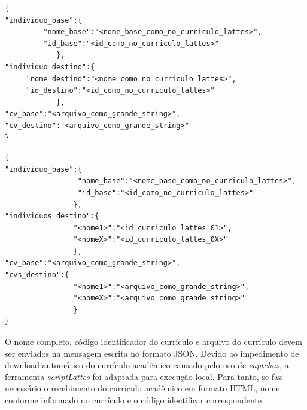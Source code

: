 \begin{lstlisting}[caption={Formato de mensagem recebido pela API (1:1).},label={lst:msgrecebida11}]
{
"individuo_base":{
         "nome_base":"<nome_base_como_no_curriculo_lattes>",
         "id_base":"<id_como_no_curriculo_lattes>"
            },
"individuo_destino":{
     "nome_destino":"<nome_como_no_curriculo_lattes>",
     "id_destino":"<id_como_no_curriculo_lattes>"
            },
"cv_base":"<arquivo_como_grande_string>",
"cv_destino":"<arquivo_como_grande_string>"
}
\end{lstlisting}



\begin{lstlisting}[caption={Formato de mensagem recebido pela API (1:N).},label={lst:msgrecebida1N}]
{
"individuo_base":{
	        	 "nome_base":"<nome_base_como_no_curriculo_lattes>",
    		     "id_base":"<id_como_no_curriculo_lattes>"
	            },
"individuos_destino":{
				"<nome1>":"<id_curriculo_lattes_01>",
				"<nomeX>":"<id_curriculo_lattes_0X>"
				},
"cv_base":"<arquivo_como_grande_string>",
"cvs_destino":{
				"<nome1>":"<arquivo_como_grande_string>",
				"<nomeX>":"<arquivo_como_grande_string>"
				}
}
\end{lstlisting}

O nome completo, código identificador do currículo e arquivo do currículo devem ser enviados na mensagem escrita no formato JSON. Devido ao impedimento de download automático do currículo acadêmico causado pelo uso de \textit{captchas}, a ferramenta \textit{scriptLattes} foi adaptada para execução local. Para tanto, se faz necessário o recebimento do currículo acadêmico em formato HTML, nome conforme informado no currículo e o código identificar correspondente.

